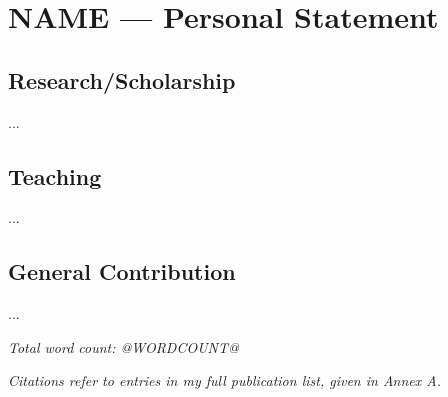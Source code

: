 


\section{NAME --- Personal Statement}

\subsection{Research/Scholarship}

...

\subsection{Teaching}

...

\subsection{General Contribution}

...

\hfill\emph{Total word count: @WORDCOUNT@}

{\it Citations refer to entries in my full publication list, given in Annex A.}

